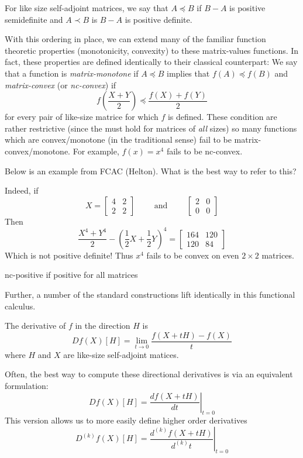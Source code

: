 \begin{definition}
\label{def:LoewnerOrder}
  For like size self-adjoint matrices, we say that \(A \preceq B\) if \(B - A \)
  is positive semidefinite and \(A \prec B\) is \(B-A\) is positive definite.
\end{definition}

With this ordering in place, we can extend many of the familiar function
theoretic properties (monotonicity, convexity) to these matrix-values functions.
In fact, these properties are defined identically to their classical counterpart:
We say that a function is \emph{matrix-monotone} if \(A \preceq B\) implies that
\(f(A) \preceq f(B)\) and \emph{matrix-convex} (or \emph{nc-convex}) if
\[
  f \left( \frac{X+Y}{2} \right) \preceq \frac{f(X)+f(Y)}{2}
\]
for every pair of like-size matrice for which \(f\) is defined. These condition
are rather restrictive (since the must hold for matrices of \emph{all} sizes) so
many functions which are convex/monotone (in the traditional sense) fail to be
matrix-convex/monotone. For example, \(f(x)=x^4\) fails to be nc-convex.
{\color{red} Below is an example from FCAC (Helton). What is the best way to
  refer to this?

Indeed, if
\[
  X = \begin{bmatrix} 4 &2\\2&2 \end{bmatrix}  \qquad \text{ and } \qquad \begin{bmatrix} 2&0\\0&0 \end{bmatrix}
\]
Then
\[
  \frac{X^4+Y^4}{2} - \left( \frac{1}{2}X +\frac{1}{2}Y \right) ^4
  = \begin{bmatrix} 164 &120\\120&84 \end{bmatrix}
\]
Which is not positive definite! Thus \(x^4\) fails to be convex on even
\(2\times 2\) matrices.
}

{\color{blue} nc-positive if positive for all matrices}

Further, a number of the standard constructions lift identically in this
functional calculus.
\begin{definition}
  \label{def:DirDeriv}
  The derivative of \(f\) in the direction \(H\) is
  \[
    Df(X)[H] = \lim_{t \to 0} \frac{f(X+tH) - f(X)}{t}
  \]
  where \(H\) and \(X\) are like-size self-adjoint matices.
\end{definition}

Often, the best way to compute these directional derivatives is via an
equivalent formulation:
\[
    Df(X)[H] = \left.\frac{df(X+tH)}{dt}\right|_{t=0}
\]
This version allows us to more easily define higher order derivatives
\[
    D^{(k)}f(X)[H] = \left.\frac{d^{(k)}f(X+tH)}{d^{(k)}t}\right|_{t=0}
\]

